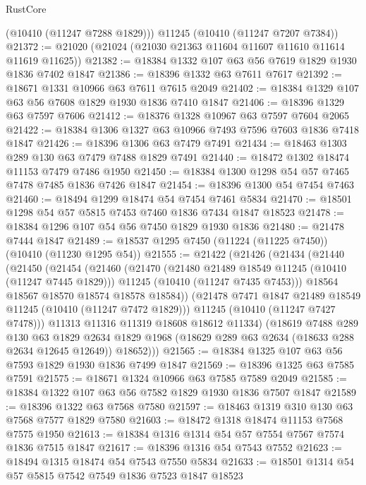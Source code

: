 \begin{lexlean}{RustCore}
\begin{coremodule}
      (@10410 (@11247 @7288 @1829)))
    @11245
    (@10410 (@11247 @7207 @7384))
@21372 := @21020 (@21024 (@21030 @21363 @11604 @11607 @11610 @11614 @11619 @11625))
@21382 := @18384 @1332 @107 @63 @56 @7619 @1829 @1930 @1836 @7402 @1847
@21386 := @18396 @1332 @63 @7611 @7617
@21392 := @18671 @1331 @10966 @63 @7611 @7615 @2049
@21402 := @18384 @1329 @107 @63 @56 @7608 @1829 @1930 @1836 @7410 @1847
@21406 := @18396 @1329 @63 @7597 @7606
@21412 := @18376 @1328 @10967 @63 @7597 @7604 @2065
@21422 := @18384 @1306 @1327 @63 @10966 @7493 @7596 @7603 @1836 @7418 @1847
@21426 := @18396 @1306 @63 @7479 @7491
@21434 := @18463 @1303 @289 @130 @63 @7479 @7488 @1829 @7491
@21440 := @18472 @1302 @18474 @11153 @7479 @7486 @1950
@21450 := @18384 @1300 @1298 @54 @57 @7465 @7478 @7485 @1836 @7426 @1847
@21454 := @18396 @1300 @54 @7454 @7463
@21460 := @18494 @1299 @18474 @54 @7454 @7461 @5834
@21470 := @18501 @1298 @54 @57 @5815 @7453 @7460 @1836 @7434 @1847 @18523
@21478 := @18384 @1296 @107 @54 @56 @7450 @1829 @1930 @1836
@21480 := @21478 @7444 @1847
@21489 := @18537 @1295 @7450 (@11224 (@11225 @7450)) (@10410 (@11230 @1295 @54))
@21555 := @21422
    (@21426
      (@21434
        (@21440
          (@21450
            (@21454
              (@21460
                (@21470
                  (@21480 @21489 @18549 @11245 (@10410 (@11247 @7445 @1829)))
                  @11245
                  (@10410 (@11247 @7435 @7453)))
                @18564
                @18567
                @18570
                @18574
                @18578
                @18584))
            (@21478 @7471 @1847 @21489 @18549 @11245 (@10410 (@11247 @7472 @1829)))
            @11245
            (@10410 (@11247 @7427 @7478)))
          @11313
          @11316
          @11319
          @18608
          @18612
          @11334)
        (@18619
          @7488
          @289
          @130
          @63
          @1829
          @2634
          @1829
          @1968
          (@18629 @289 @63 @2634 (@18633 @288 @2634 @12645 @12649))
          @18652)))
@21565 := @18384 @1325 @107 @63 @56 @7593 @1829 @1930 @1836 @7499 @1847
@21569 := @18396 @1325 @63 @7585 @7591
@21575 := @18671 @1324 @10966 @63 @7585 @7589 @2049
@21585 := @18384 @1322 @107 @63 @56 @7582 @1829 @1930 @1836 @7507 @1847
@21589 := @18396 @1322 @63 @7568 @7580
@21597 := @18463 @1319 @310 @130 @63 @7568 @7577 @1829 @7580
@21603 := @18472 @1318 @18474 @11153 @7568 @7575 @1950
@21613 := @18384 @1316 @1314 @54 @57 @7554 @7567 @7574 @1836 @7515 @1847
@21617 := @18396 @1316 @54 @7543 @7552
@21623 := @18494 @1315 @18474 @54 @7543 @7550 @5834
@21633 := @18501 @1314 @54 @57 @5815 @7542 @7549 @1836 @7523 @1847 @18523

\end{coremodule}
\end{lexlean}
